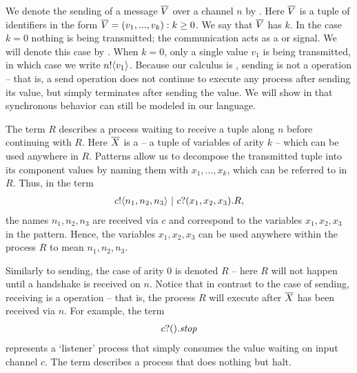 	We denote the sending of a message $\overline{V}$ over a channel $n$ by .  
Here $\overline{V}$ is a tuple of identifiers in the form $\overline{V}=(v_1,...,v_k):k\geq 0$.  
We say that $\overline{V}$ has  $k$.  
In the case $k=0$ nothing is being transmitted; the communication acts as a  or signal.  
We will denote this case by .  
When $k=0$, only a single value $v_1$ is being transmitted, in which case we write ${n}!\langle{v_1}\rangle$.  
Because our calculus is , sending is not a  operation -- that is, a send operation does not continue to execute any process after sending its value, but simply terminates after sending the value.  
We will show in  that synchronous behavior can still be modeled in our language.
	
	The term $R$ describes a process waiting to receive a tuple along $n$ before continuing with $R$.  
Here $\overline{X}$ is a  -- a tuple of variables of arity $k$ -- which can be used anywhere in $R$.  
Patterns allow us to decompose the transmitted tuple into its component values by naming them with $x_1,...,x_k$, which can be referred to in $R$.  
Thus, in the term
	\begin{align}
		{c}!\langle{n_1,n_2,n_3}\rangle \ |\  {c}?({x_1,x_2,x_3}). R,
	\end{align}
the names $n_1,n_2,n_3$ are received via $c$ and correspond to the variables $x_1,x_2,x_3$ in the pattern.  
 Hence, the variables $x_1,x_2,x_3$ can be used anywhere within the process $R$ to mean $n_1,n_2,n_3$.  


Similarly to sending, the case of arity 0 is denoted $R$ -- here $R$ will not happen until a handshake is received on $n$.  
Notice that in contrast to the case of sending, receiving is a  operation -- that is, the process $R$ will execute after $\overline{X}$ has been received via $n$.  
For example, the term
\begin{align}
	{c}?({}).\mbox{\emph{stop}}
\end{align}
represents a `listener'	process that simply consumes the value waiting on input channel $c$.  
The term \pstop describes a process that does nothing but halt.

